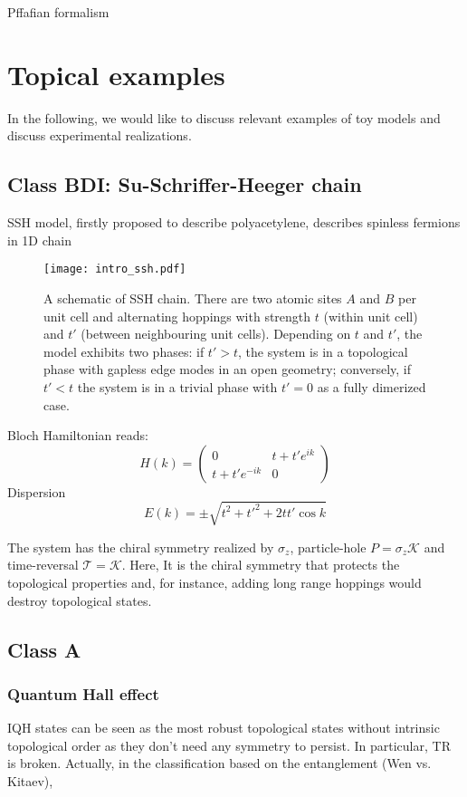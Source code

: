 {Pffafian formalism 

\section{Topical examples}
In the following, we would like to discuss relevant examples of toy models and discuss experimental realizations.

\subsection{Class BDI: Su-Schriffer-Heeger chain}
SSH model, firstly proposed to describe polyacetylene, describes spinless fermions in 1D chain~\cite{SSH1976}

\begin{figure}[H]
\centering
\texttt{[image: intro\_ssh.pdf]}
\caption{A schematic of SSH chain. There are two atomic sites $A$ and $B$ per unit cell and alternating hoppings with strength $t$ (within unit cell) and $t'$ (between neighbouring unit cells). Depending on $t$ and $t'$,  the model exhibits two phases: if $t' > t$, the system is in a topological phase with gapless edge modes in an open geometry; conversely, if $t' < t$ the system is in a trivial phase with $t' = 0$ as a fully dimerized case.}
\label{fig:ssh}
\end{figure}

Bloch Hamiltonian reads:
\begin{equation}
H (k) = \begin{pmatrix}
0 & t + t' e^{i k} \\
t + t' e^{-i k} & 0
\end{pmatrix}
\label{eq:ssh}
\end{equation}
Dispersion
\begin{equation}
E(k) = \pm \sqrt{t^2 + t'^2 + 2 t t' \cos k}
\end{equation}



The system has the chiral symmetry realized by $\sigma_z$, particle-hole $P = \sigma_z \mathcal{K}$ and time-reversal $\mathcal{T} = \mathcal{K}$. Here, It is the chiral symmetry that protects the topological properties and, for instance, adding long range hoppings would destroy topological states.


\subsection{Class A}
\subsubsection{Quantum Hall effect}
IQH states can be seen as the most robust topological states without intrinsic topological order as they don't need any symmetry to persist. In particular, TR is broken. Actually, in the classification based on the entanglement (Wen vs. Kitaev),


}
